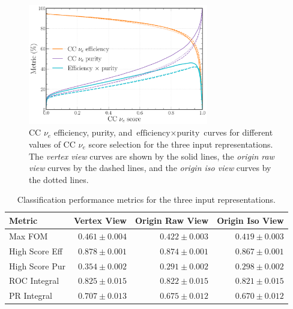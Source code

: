 \begin{figure} %
    \includegraphics[width=0.7\textwidth]{diagrams/7-results/repr_nuel_eff_curves.pdf}
    \caption[CC $\nu_{e}$ efficiency and purity curves for different input representations]
    {CC $\nu_{e}$ efficiency, purity, and $\text{efficiency}\times\text{purity}$ curves for
        different values of CC $\nu_{e}$ score selection for the three input representations. The
        \emph{vertex view} curves are shown by the solid lines, the \emph{origin raw view} curves
        by the dashed lines, and the \emph{origin iso view} curves by the dotted lines.}
    \label{fig:repr_nuel_eff_curves}
\end{figure}

\begin{table} %
    \begin{tabular}{lrrr}
        Metric         & Vertex View    & Origin Raw View & Origin Iso View \\
        \midrule
        Max FOM        & \textbf{$0.461\pm0.004$} & $0.422\pm0.003$ & $0.419\pm0.003$ \\
        High Score Eff & \textbf{$0.878\pm0.001$} & $0.874\pm0.001$ & $0.867\pm0.001$ \\
        High Score Pur & \textbf{$0.354\pm0.002$} & $0.291\pm0.002$ & $0.298\pm0.002$ \\
        ROC Integral   & \textbf{$0.825\pm0.015$} & $0.822\pm0.015$ & $0.821\pm0.015$ \\
        PR Integral    & \textbf{$0.707\pm0.013$} & $0.675\pm0.012$ & $0.670\pm0.012$ \\
    \end{tabular}
    \caption[Classification performance metrics for different input representations]
    {Classification performance metrics for the three input representations.}
    \label{tab:repr}
\end{table}

